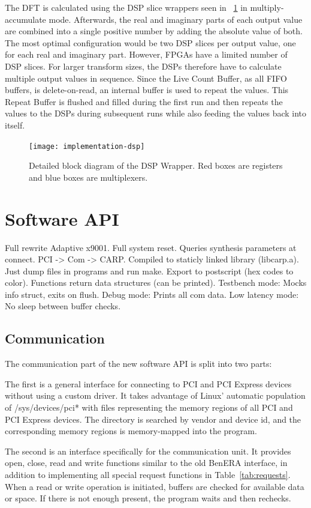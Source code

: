 The DFT is calculated using the DSP slice wrappers seen in \figurename~\ref{fig:implementation-dsp} in multiply-accumulate mode.
Afterwards, the real and imaginary parts of each output value are combined into a single positive number by adding the absolute value of both.
The most optimal configuration would be two DSP slices per output value, one for each real and imaginary part.
However, FPGAs have a limited number of DSP slices.
For larger transform sizes, the DSPs therefore have to calculate multiple output values in sequence.
Since the Live Count Buffer, as all FIFO buffers, is delete-on-read, an internal buffer is used to repeat the values.
This Repeat Buffer is flushed and filled during the first run and then repeats the values to the DSPs during subsequent runs while also feeding the values back into itself.

\begin{figure}[!ht]
    \centering
    \texttt{[image: implementation-dsp]}
    \caption[DSP Wrapper]{
        Detailed block diagram of the DSP Wrapper.
        Red boxes are registers and blue boxes are multiplexers.
    }
    \label{fig:implementation-dsp}
\end{figure}


\section{Software API}

\TODO
Full rewrite
Adaptive x9001.
Full system reset.
Queries synthesis parameters at connect.
PCI -> Com -> CARP.
Compiled to staticly linked library (libcarp.a).
Just dump files in programs and run make.
Export to postscript (hex codes to color).
Functions return data structures (can be printed).
Testbench mode: Mocks info struct, exits on flush.
Debug mode: Prints all com data.
Low latency mode: No sleep between buffer checks.

\subsection{Communication}

The communication part of the new software API is split into two parts:

The first is a general interface for connecting to PCI and PCI Express devices without using a custom driver.
It takes advantage of Linux' automatic population of /sys/devices/pci* with files representing the memory regions of all PCI and PCI Express devices.
The directory is searched by vendor and device id, and the corresponding memory regions is memory-mapped into the program.

The second is an interface specifically for the communication unit.
It provides open, close, read and write functions similar to the old BenERA interface, in addition to implementing all special request functions in Table~\ref{tab:requests}.
When a read or write operation is initiated, buffers are checked for available data or space.
If there is not enough present, the program waits and then rechecks.

